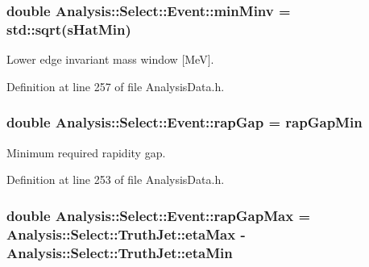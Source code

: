 \subsubsection[{\texorpdfstring{min\+Minv}{minMinv}}]{\setlength{\rightskip}{0pt plus 5cm}double Analysis\+::\+Select\+::\+Event\+::min\+Minv = std\+::sqrt({\bf s\+Hat\+Min})\hspace{0.3cm}{\ttfamily [static]}}\hypertarget{namespaceAnalysis_1_1Select_1_1Event_aad3b80c550b598d2523d76c1819f69fc}{}\label{namespaceAnalysis_1_1Select_1_1Event_aad3b80c550b598d2523d76c1819f69fc}


Lower edge invariant mass window \mbox{[}MeV\mbox{]}. 



Definition at line 257 of file Analysis\+Data.\+h.

\subsubsection[{\texorpdfstring{rap\+Gap}{rapGap}}]{\setlength{\rightskip}{0pt plus 5cm}double Analysis\+::\+Select\+::\+Event\+::rap\+Gap = {\bf rap\+Gap\+Min}\hspace{0.3cm}{\ttfamily [static]}}\hypertarget{namespaceAnalysis_1_1Select_1_1Event_a5be60eaed61b702f72c99039d08478bd}{}\label{namespaceAnalysis_1_1Select_1_1Event_a5be60eaed61b702f72c99039d08478bd}


Minimum required rapidity gap. 



Definition at line 253 of file Analysis\+Data.\+h.

\subsubsection[{\texorpdfstring{rap\+Gap\+Max}{rapGapMax}}]{\setlength{\rightskip}{0pt plus 5cm}double Analysis\+::\+Select\+::\+Event\+::rap\+Gap\+Max = {\bf Analysis\+::\+Select\+::\+Truth\+Jet\+::eta\+Max} -\/ {\bf Analysis\+::\+Select\+::\+Truth\+Jet\+::eta\+Min}\hspace{0.3cm}{\ttfamily [static]}}\hypertarget{namespaceAnalysis_1_1Select_1_1Event_a46517b487f23e3507e9b714039ead277}{}\label{namespaceAnalysis_1_1Select_1_1Event_a46517b487f23e3507e9b714039ead277}


